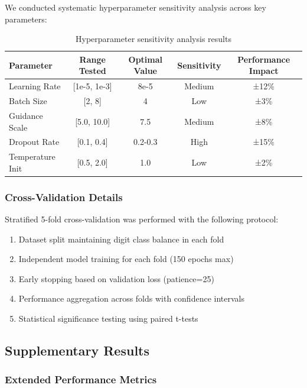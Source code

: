 \documentclass[11pt,a4paper]{article}
\begin{document}
We conducted systematic hyperparameter sensitivity analysis across key parameters:

\begin{table}[H]
\centering
\caption{Hyperparameter sensitivity analysis results}
\begin{tabular}{lcccc}
\toprule
\textbf{Parameter} & \textbf{Range Tested} & \textbf{Optimal Value} & \textbf{Sensitivity} & \textbf{Performance Impact} \\
\midrule
Learning Rate & [1e-5, 1e-3] & 8e-5 & Medium & ±12\% \\
Batch Size & [2, 8] & 4 & Low & ±3\% \\
Guidance Scale & [5.0, 10.0] & 7.5 & Medium & ±8\% \\
Dropout Rate & [0.1, 0.4] & 0.2-0.3 & High & ±15\% \\
Temperature Init & [0.5, 2.0] & 1.0 & Low & ±2\% \\
\bottomrule
\end{tabular}
\end{table}

\subsubsection*{Cross-Validation Details}

Stratified 5-fold cross-validation was performed with the following protocol:
\begin{enumerate}
    \item Dataset split maintaining digit class balance in each fold
    \item Independent model training for each fold (150 epochs max)
    \item Early stopping based on validation loss (patience=25)
    \item Performance aggregation across folds with confidence intervals
    \item Statistical significance testing using paired t-tests
\end{enumerate}

\subsection*{Supplementary Results}

\subsubsection*{Extended Performance Metrics}
\end{document}
